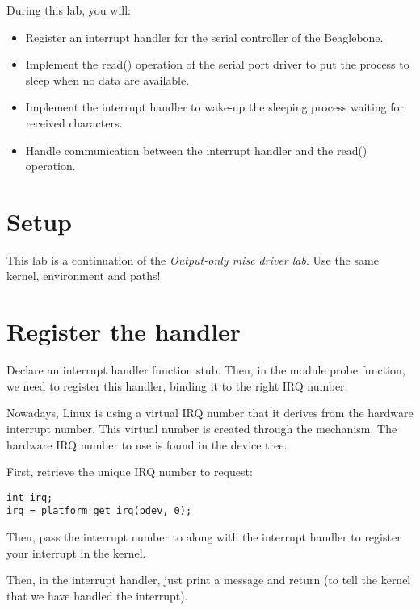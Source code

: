 
During this lab, you will:

\begin{itemize}
\item Register an interrupt handler for the serial controller of the
  Beaglebone.
\item Implement the read() operation of the serial port driver to put
  the process to sleep when no data are available.
\item Implement the interrupt handler to wake-up the sleeping process
  waiting for received characters.
\item Handle communication between the interrupt handler and the
  read() operation.
\end{itemize}

\section{Setup}

This lab is a continuation of the {\em Output-only misc driver
lab}. Use the same kernel, environment and paths!

\section{Register the handler}

Declare an interrupt handler function stub. Then, in the module probe
function, we need to register this handler, binding it to the right
IRQ number.

Nowadays, Linux is using a virtual IRQ number that it derives from the
hardware interrupt number. This virtual number is created through the
 mechanism. The hardware IRQ number to use is found in
the device tree.

First, retrieve the unique IRQ number to request:

\begin{verbatim}
int irq;
irq = platform_get_irq(pdev, 0);
\end{verbatim}

Then, pass the interrupt number to  along
with the interrupt handler to register your interrupt in the kernel.

Then, in the interrupt handler, just print a message and return
 (to tell the kernel that we have handled the
interrupt).

